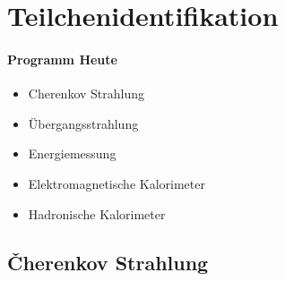

\chapter{Teilchenidentifikation}

\subsubsection*{Programm Heute}

\begin{itemize}
	\item Cherenkov Strahlung
	\item Übergangsstrahlung
	\item Energiemessung
	\item Elektromagnetische Kalorimeter
	\item Hadronische Kalorimeter
\end{itemize}

\section{\texorpdfstring{\v{C}}{C}herenkov Strahlung}


\hft


